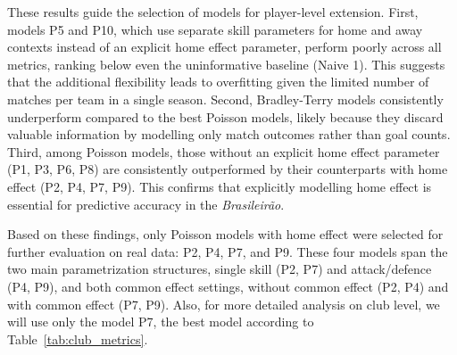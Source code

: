 These results guide the selection of models for player-level extension.
First, models P5 and P10, which use separate skill parameters for home and away contexts instead of an explicit home effect parameter, perform poorly across all metrics, ranking below even the uninformative baseline (Naive 1).
This suggests that the additional flexibility leads to overfitting given the limited number of matches per team in a single season.
Second, Bradley-Terry models consistently underperform compared to the best Poisson models, likely because they discard valuable information by modelling only match outcomes rather than goal counts.
Third, among Poisson models, those without an explicit home effect parameter (P1, P3, P6, P8) are consistently outperformed by their counterparts with home effect (P2, P4, P7, P9).
This confirms that explicitly modelling home effect is essential for predictive accuracy in the \textit{Brasileirão}.

Based on these findings, only Poisson models with home effect were selected for further evaluation on real data: P2, P4, P7, and P9.
These four models span the two main parametrization structures, single skill (P2, P7) and attack/defence (P4, P9), and both common effect settings, without common effect (P2, P4) and with common effect (P7, P9).
Also, for more detailed analysis on club level, we will use only the model P7, the best model according to Table~\ref{tab:club_metrics}.
